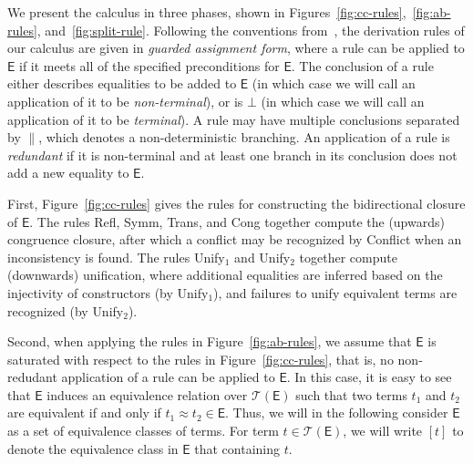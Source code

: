 \documentclass[a4paper,oribibl,envcountsame,draft]{llncs}
\newcommand{\Ec}{\mathsf{E}}
\newcommand{\tEc}{\mathcal{T}(\Ec)}
\newcommand{\rn}[1]{\textsf{\small #1}}
\newcommand{\teq}{\approx}
\newcommand{\ec}[1]{ [ #1 ] }
\begin{document}
We present the calculus in three phases, shown in Figures~\ref{fig:cc-rules},~\ref{fig:ab-rules}, and~\ref{fig:split-rule}.
Following the conventions from~\cite{}, 
the derivation rules of our calculus are given in \emph{guarded assignment form},
where a rule can be applied to $\Ec$ if it meets all of the specified preconditions for $\Ec$.
The conclusion of a rule either describes equalities to be added to $\Ec$ (in which case we will call an application of it to be \emph{non-terminal}),
or is $\bot$ (in which case we will call an application of it to be \emph{terminal}).
A rule may have multiple conclusions separated by $\parallel$, which denotes a non-deterministic branching.
An application of a rule is \emph{redundant} if it is non-terminal and at least one branch in its conclusion does not add a new equality to $\Ec$.

First, Figure~\ref{fig:cc-rules} gives the rules for constructing the bidirectional closure of $\Ec$.
The rules \rn{Refl}, \rn{Symm}, \rn{Trans}, and \rn{Cong} together compute the (upwards) congruence closure,
after which a conflict may be recognized by \rn{Conflict} when an inconsistency is found.
The rules \rn{Unify$_1$} and \rn{Unify$_2$} together compute (downwards) unification,
where additional equalities are inferred based on the injectivity of constructors (by \rn{Unify$_1$}),
and failures to unify equivalent terms are recognized (by \rn{Unify$_2$}).

Second, when applying the rules in Figure~\ref{fig:ab-rules}, 
we assume that $\Ec$ is saturated with respect to the rules in Figure~\ref{fig:cc-rules}, that is,
no non-redudant application of a rule can be applied to $\Ec$.
In this case, it is easy to see that $\Ec$ induces an equivalence relation over $\tEc$ such that two terms $t_1$ and $t_2$ are equivalent if and only if $t_1 \teq t_2 \in \Ec$.
Thus, we will in the following consider $\Ec$ as a set of equivalence classes of terms. 
For term $t \in \tEc$, we will write $\ec{t}$ to denote the equivalence class in $\Ec$ that containing $t$.
\end{document}
